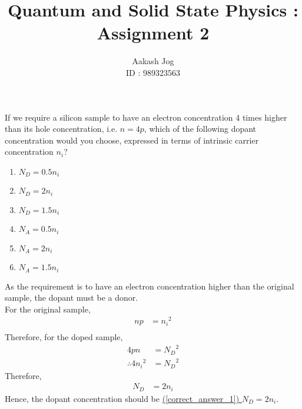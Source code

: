 \documentclass[fleqn, a4paper, 11pt, oneside]{amsart}
\title{Quantum and Solid State Physics : Assignment 2}
\author
{
	Aakash Jog\\
	ID : 989323563
}
\date{\formatdate{5}{11}{2015}}
\theoremstyle{definition}
\theoremstyle{theorem}
\renewcommand{\emph}{\uline}
\begin{document}

\maketitle

\begin{question}
	If we require a silicon sample to have an electron concentration 4 times higher than its hole concentration, i.e. $n = 4 p$, which of the following dopant concentration would you choose, expressed in terms of intrinsic carrier concentration $n_i$?
	\begin{enumerate}
		\item $N_D = 0.5 n_i$
		\item $N_D = 2 n_i$ \label{correct_answer_1}
		\item $N_D = 1.5 n_i$
		\item $N_A = 0.5 n_i$
		\item $N_A = 2 n_i$
		\item $N_A = 1.5 n_i$
	\end{enumerate}
\end{question}

\begin{solution}
	As the requirement is to have an electron concentration higher than the original sample, the dopant must be a donor.\\
	For the original sample,
	\begin{align*}
		n p &= {n_i}^2\\
	\end{align*}
	Therefore, for the doped sample,
	\begin{align*}
		4 p n &= {N_D}^2\\
		\therefore 4 {n_i}^2 &= {N_D}^2
	\end{align*}
	Therefore,
	\begin{align*}
		N_D &= 2 n_i
	\end{align*}
	Hence, the dopant concentration should be \emph{(\ref{correct_answer_1}) $N_D = 2 n_i$}.
\end{solution}
\end{document}

